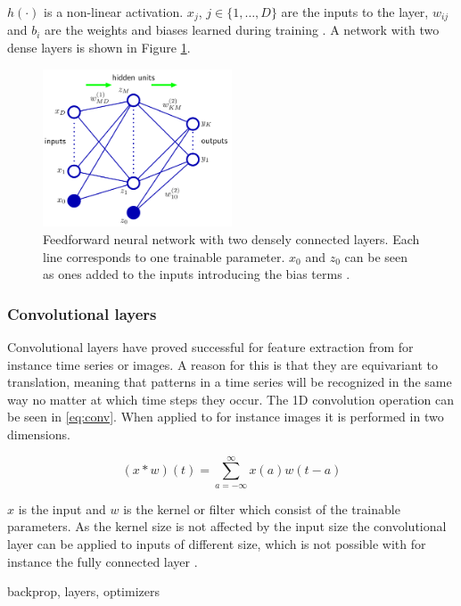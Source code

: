 $h(\cdot)$ is a non-linear activation. $x_j$, $j \in \{1, \hdots, D\}$ are the inputs to the layer, $w_{ij}$ and $b_i$ are the weights and biases learned during training \cite{Bishop2006}. A network with two dense layers is shown in Figure \ref{fig:dense}.

\begin{figure}
  \centering
  \includegraphics[width=0.5\textwidth]{files/figs/mlp.png}
  \caption{Feedforward neural network with two densely connected layers. Each line corresponds to one trainable parameter. $x_0$ and $z_0$ can be seen as ones added to the inputs introducing the bias terms \cite{Bishop2006}.}
  \label{fig:dense}
\end{figure}

\subsubsection{Convolutional layers}
Convolutional layers have proved successful for feature extraction from for instance time series or images. A reason for this is that they are equivariant to translation, meaning that patterns in a time series will be recognized in the same way no matter at which time steps they occur. The 1D convolution operation can be seen in \eqref{eq:conv}. When applied to for instance images it is performed in two dimensions.

\begin{equation}
   (x * w)(t) = \sum_{a=-\infty}^\infty x(a)w(t-a)
   \label{eq:conv}
\end{equation}

$x$ is the input and $w$ is the kernel or filter which consist of the trainable parameters. As the kernel size is not affected by the input size the convolutional layer can be applied to inputs of different size, which is not possible with for instance the fully connected layer \cite{Goodfellow2016}.

backprop, layers, optimizers

